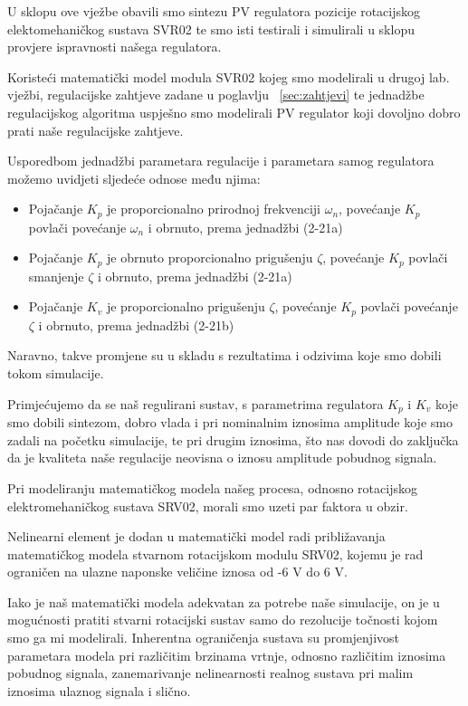 \documentclass[12pt,a4paper]{article}
\begin{document}
U sklopu ove vježbe obavili smo sintezu PV regulatora pozicije rotacijskog elektomehaničkog sustava SVR02 te smo isti testirali i simulirali u sklopu provjere ispravnosti našega regulatora.

Koristeći matematički model modula SVR02 kojeg smo modelirali u drugoj lab. vježbi, regulacijske zahtjeve zadane u poglavlju ~\ref{sec:zahtjevi} te jednadžbe regulacijskog algoritma uspješno smo modelirali PV regulator koji dovoljno dobro prati naše regulacijske zahtjeve.

Usporedbom jednadžbi parametara regulacije i parametara samog regulatora možemo uvidjeti sljedeće odnose među njima:


\begin{itemize}
\item Pojačanje $K_p$ je proporcionalno prirodnoj frekvenciji $\omega_n$, povećanje $K_p$ povlači povećanje $\omega_n$ i obrnuto, prema jednadžbi (2-21a)
\item Pojačanje $K_p$ je obrnuto proporcionalno prigušenju $\zeta$, povećanje $K_p$ povlači smanjenje $\zeta$ i obrnuto, prema jednadžbi (2-21a)
\item Pojačanje $K_v$ je proporcionalno prigušenju $\zeta$, povećanje $K_p$ povlači povećanje $\zeta$ i obrnuto, prema jednadžbi (2-21b)
\end{itemize}

Naravno, takve promjene su u skladu s rezultatima i odzivima koje smo dobili tokom simulacije.

Primjećujemo da se naš regulirani sustav, s parametrima regulatora $K_p$ i $K_v$ koje smo dobili sintezom, dobro vlada i pri nominalnim iznosima amplitude koje smo zadali na početku simulacije, te pri drugim iznosima, što nas dovodi do zaključka da je kvaliteta naše regulacije neovisna o iznosu amplitude pobudnog signala.

Pri modeliranju matematičkog modela našeg procesa, odnosno rotacijskog elektromehaničkog sustava SRV02, morali smo uzeti par faktora u obzir.

Nelinearni element je dodan u matematički model radi približavanja matematičkog modela stvarnom rotacijskom modulu SRV02, kojemu je rad ograničen na ulazne naponske veličine iznosa od -6 V do 6 V.

Iako je naš matematički modela adekvatan za potrebe naše simulacije, on je u mogućnosti pratiti stvarni rotacijski sustav samo do rezolucije točnosti kojom smo ga mi modelirali. Inherentna ograničenja sustava su promjenjivost parametara modela pri različitim brzinama vrtnje, odnosno različitim iznosima pobudnog signala, zanemarivanje nelinearnosti realnog sustava pri malim iznosima ulaznog signala i slično.
\end{document}
